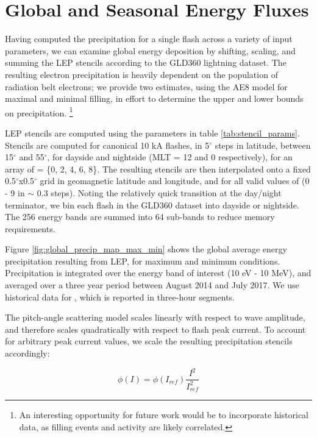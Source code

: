 

\section{Global and Seasonal Energy Fluxes}

Having computed the precipitation for a single flash across a variety of input parameters, we can examine global energy deposition by shifting, scaling, and summing the LEP stencils according to the GLD360 lightning dataset. The resulting electron precipitation is heavily dependent on the population of radiation belt electrons; we provide two estimates, using the AE8 model for maximal and minimal filling, in effort to determine the upper and lower bounds on precipitation. \footnote{An interesting opportunity for future work would be to incorporate historical data, as filling events and \kp{} activity are likely correlated.}

LEP stencils are computed using the parameters in table \ref{tab:stencil_params}. Stencils are computed for canonical 10 kA flashes, in 5$^\circ$ steps in latitude, between 15$^\circ$ and 55$^\circ$, for dayside and nightside (MLT = 12 and 0 respectively), for an array of \kp{} = \{0, 2, 4, 6, 8\}. The resulting stencils are then interpolated onto a fixed 0.5$^\circ$x0.5$^\circ$ grid in geomagnetic latitude and longitude, and for all valid values of \kp{} (0 - 9 in $\sim$ 0.3 steps). Noting the relatively quick transition at the day/night terminator, we bin each flash in the GLD360 dataset into dayside or nightside. The 256 energy bands are summed into 64 sub-bands to reduce memory requirements. 

Figure \ref{fig:global_precip_map_max_min} shows the global average energy precipitation resulting from LEP, for maximum and minimum conditions. Precipitation is integrated over the energy band of interest (10 eV - 10 MeV), and averaged over a three year period between August 2014 and July 2017. We use historical data for \kp{}, which is reported in three-hour segments.

The pitch-angle scattering model scales linearly with respect to wave amplitude, and therefore scales quadratically with respect to flash peak current. To account for arbitrary peak current values, we scale the resulting precipitation stencils accordingly:

\begin{equation}
\phi(I) = \phi(I_{ref})\frac{I^2}{I_{ref}^2} 
\end{equation}


